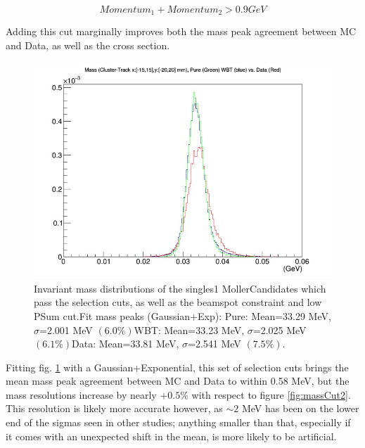 \documentclass{article}
\begin{document}
 \begin{equation} \label{eq:PSumCut}
  	Momentum_1 + Momentum_2>0.9 GeV
	\end{equation}

Adding this cut marginally  improves both the mass peak agreement between MC and Data, as well as the cross section.

\begin{figure}[H]
  	\includegraphics[width=\linewidth]{MollerPlots/massTightESum}
  	\caption{Invariant mass distributions of the singles1 MollerCandidates which pass the selection cuts, as well as the beamspot constraint and low PSum cut.\newline \newline Fit mass peaks (Gaussian+Exp): \newline Pure: Mean=33.29 MeV,  $\sigma$=2.001 MeV $(6.0\%)$\newline WBT: Mean=33.23 MeV, $\sigma$=2.025 MeV $(6.1\%)$\newline Data: Mean=33.81 MeV, $\sigma$=2.541 MeV $(7.5\%)$.}
  	\label{fig:massTightPSum}
	\end{figure}

Fitting fig. \ref{fig:massTightPSum} with a Gaussian+Exponential, this set of selection cuts brings the mean mass peak agreement between MC and Data to within 0.58 MeV, but the mass resolutions increase by nearly $+0.5\%$ with respect to figure \ref{fig:massCut2}. This resolution is likely more accurate however, as $\sim2$ MeV has been on the lower end of the sigmas seen in other studies; anything smaller than that, especially if it comes with an unexpected shift in the mean, is more likely to be artificial.
\end{document}
